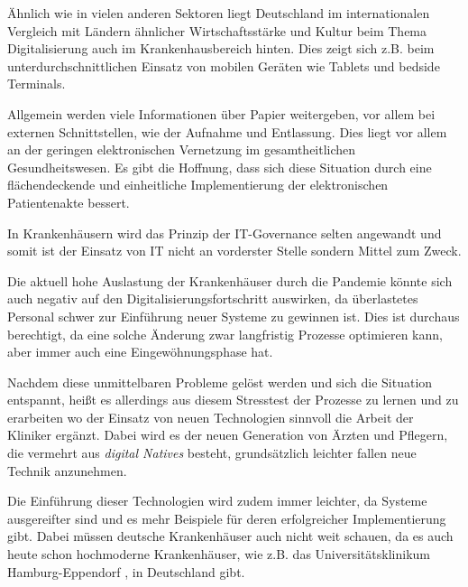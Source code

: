 Ähnlich wie in vielen anderen Sektoren liegt Deutschland im internationalen Vergleich mit Ländern ähnlicher Wirtschaftsstärke und Kultur beim Thema Digitalisierung auch im Krankenhausbereich hinten. Dies zeigt sich z.B. beim unterdurchschnittlichen Einsatz von mobilen Geräten wie Tablets und bedside Terminals. 

Allgemein werden viele Informationen über Papier weitergeben, vor allem bei externen Schnittstellen, wie der Aufnahme und Entlassung. Dies liegt vor allem an der geringen elektronischen Vernetzung im gesamtheitlichen Gesundheitswesen. Es gibt die Hoffnung, dass sich diese Situation durch eine flächendeckende und einheitliche Implementierung der elektronischen Patientenakte bessert.

In Krankenhäusern wird das Prinzip der IT-Governance selten angewandt und somit ist der Einsatz von IT nicht an vorderster Stelle sondern Mittel zum Zweck.

Die aktuell hohe Auslastung der Krankenhäuser durch die Pandemie könnte sich auch negativ auf den Digitalisierungsfortschritt auswirken, da überlastetes Personal schwer zur Einführung neuer Systeme zu gewinnen ist. Dies ist durchaus berechtigt, da eine solche Änderung zwar langfristig Prozesse optimieren kann, aber immer auch eine Eingewöhnungsphase hat.

Nachdem diese unmittelbaren Probleme gelöst werden und sich die Situation entspannt, heißt es allerdings aus diesem Stresstest der Prozesse zu lernen und zu erarbeiten wo der Einsatz von neuen Technologien sinnvoll die Arbeit der Kliniker ergänzt. Dabei wird es der neuen Generation von Ärzten und Pflegern, die vermehrt aus \textit{digital Natives} besteht, grundsätzlich leichter fallen neue Technik anzunehmen.

Die Einführung dieser Technologien wird zudem immer leichter, da Systeme ausgereifter sind und es mehr Beispiele für deren erfolgreicher Implementierung gibt. Dabei müssen deutsche Krankenhäuser auch nicht weit schauen, da es auch heute schon hochmoderne Krankenhäuser, wie z.B. das Universitätsklinikum Hamburg-Eppendorf \parencite{Baehr2019}, in Deutschland gibt.